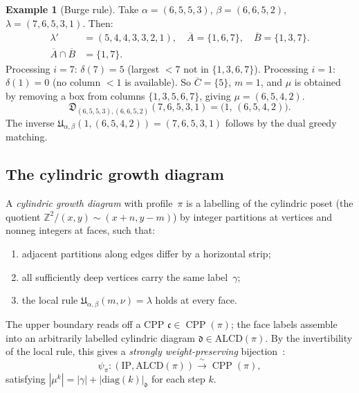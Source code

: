 \documentclass[11pt]{article}
\theoremstyle{plain}
\theoremstyle{definition}
\newtheorem{example}[theorem]{Example}
\theoremstyle{remark}
\newcommand{\Z}{\mathbb{Z}}
\newcommand{\CPP}{\operatorname{CPP}}
\begin{document}
\begin{example}[Burge rule]\label{ex:burge}
Take $\alpha = (6,5,5,3)$, $\beta = (6,6,5,2)$,
$\lambda = (7,6,5,3,1)$.  Then:
\begin{align*}
  \lambda' &= (5,4,4,3,3,2,1), \quad
  \overline{A} = \{1,6,7\}, \quad
  \overline{B} = \{1,3,7\}. \\
  \overline{A} \cap \overline{B} &= \{1,7\}.
\end{align*}
Processing $i = 7$: $\delta(7) = 5$ (largest $< 7$
not in $\{1,3,6,7\}$).
Processing $i = 1$: $\delta(1) = 0$ (no column $< 1$ is available).
So $\overline{C} = \{5\}$, $m = 1$, and $\mu$ is obtained by
removing a box from columns $\{1,3,5,6,7\}$, giving
$\mu = (6,5,4,2)$.
\[
  \boxed{\mathfrak{D}_{(6,5,5,3),(6,6,5,2)}(7,6,5,3,1)
  = \bigl(1,\,(6,5,4,2)\bigr).}
\]
The inverse $\mathfrak{U}_{\alpha,\beta}(1,(6,5,4,2))
= (7,6,5,3,1)$ follows by the dual greedy matching.
\end{example}

\subsection{The cylindric growth diagram}
\label{sec:growth-diagram}

A \emph{cylindric growth diagram} with profile~$\pi$ is a
labelling of the cylindric poset (the quotient
$\Z^2 / (x,y) \sim (x+n, y-m)$) by integer partitions at
vertices and nonneg integers at faces, such that:
\begin{enumerate}
\item adjacent partitions along edges differ by a horizontal strip;
\item all sufficiently deep vertices carry the same label~$\gamma$;
\item the local rule $\mathfrak{U}_{\alpha,\beta}(m,\nu) = \lambda$
  holds at every face.
\end{enumerate}
The upper boundary reads off a CPP
$\mathfrak{c} \in \CPP(\pi)$; the face labels assemble into an
arbitrarily labelled cylindric diagram $\mathfrak{d} \in \mathrm{ALCD}(\pi)$.
By the invertibility of the local rule, this gives a
\emph{strongly weight-preserving} bijection~\cite{langer-thesis}:
\begin{equation}\label{eq:growth-bijection}
  \psi_\pi : (\mathrm{IP}, \mathrm{ALCD}(\pi))
  \xrightarrow{\;\sim\;} \CPP(\pi),
\end{equation}
satisfying
$|\mu^k| = |\gamma| + |\mathrm{diag}(k)|_{\mathfrak{d}}$
for each step $k$.
\end{document}
